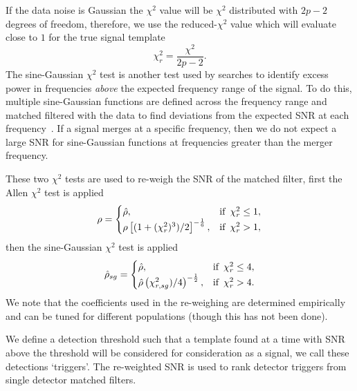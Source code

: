 If the data noise is Gaussian the $\chi^{2}$ value will be $\chi^{2}$ distributed with $2p - 2$ degrees of freedom, therefore, we use the reduced-$\chi^{2}$ value which will evaluate close to $1$ for the true signal template
%
\begin{equation}
    \chi_{r}^{2} = \frac{\chi^{2}}{2p-2}.
    \label{2:eq:reduced_chisq}
\end{equation}
%
The sine-Gaussian $\chi^{2}$ test is another test used by \gwadj searches to identify excess power in frequencies \textit{above} the expected frequency range of the signal. To do this, multiple sine-Gaussian functions are defined across the frequency range and matched filtered with the data to find deviations from the expected SNR at each frequency~\cite{PyCBC_sg:2018}. If a \gwadj signal merges at a specific frequency, then we do not expect a large SNR for sine-Gaussian functions at frequencies greater than the merger frequency.

These two $\chi^{2}$ tests are used to re-weigh the SNR of the matched filter, first the Allen $\chi^{2}$ test is applied~\cite{McIsaac_Chi:2022}
%
\begin{equation}
    \rho =
    \begin{cases}
        \hat{\rho}, & \text{if \,} \chi^{2}_{r} \le 1, \\
        \rho\left[(1 + (\chi^{2}_{r})^{3}) /2\right]^{-\frac{1}{6}}, & \text{if \,} \chi^{2}_{r} > 1,
    \end{cases}
\end{equation}
%
then the sine-Gaussian $\chi^{2}$ test is applied
%
\begin{equation}
    \hat{\rho}_{sg} =
    \begin{cases}
        \hat{\rho}, & \text{if \,} \chi^{2}_{r} \le 4, \\
        \hat{\rho}\left(\chi^{2}_{r, sg})/4\right)^{-\frac{1}{2}}, & \text{if \,} \chi^{2}_{r} > 4.
    \end{cases}
\end{equation}
%
We note that the coefficients used in the re-weighing are determined empirically and can be tuned for different populations (though this has not been done).

We define a detection threshold such that a template found at a time with SNR above the threshold will be considered for consideration as a \gwadj signal, we call these detections `triggers'. The re-weighted SNR is used to rank detector triggers from single detector matched filters.

